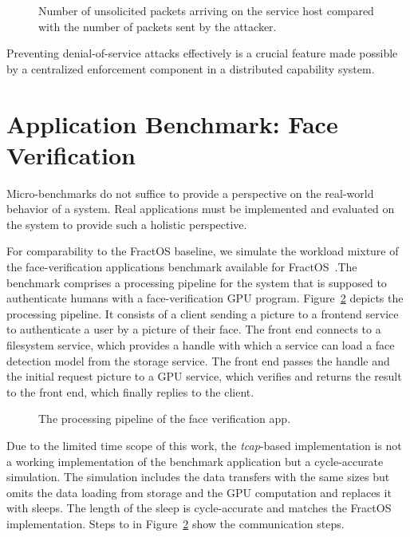 \begin{figure}[H]
  \centering
  
  \caption{\label{fig:dos-protection} Number of unsolicited packets arriving on the service host compared with the number of packets sent by the attacker.}
\end{figure}
Preventing denial-of-service attacks effectively is a crucial feature made possible by a centralized enforcement component in a distributed capability system.

\section{Application Benchmark: Face Verification}
Micro-benchmarks do not suffice to provide a perspective on the real-world behavior of a system. Real applications must be implemented and evaluated on the system to provide such a holistic perspective.

For comparability to the FractOS baseline, we simulate the workload mixture of the face-verification applications benchmark available for FractOS~\cite{vilanovaSlashingDisaggregationTax2022}.\@ The benchmark comprises a processing pipeline for the system that is supposed to authenticate humans with a face-verification \ac{GPU} program. Figure~\ref{fig:facever-overview} depicts the processing pipeline. It consists of a client sending a picture to a frontend service to authenticate a user by a picture of their face. The front end connects to a filesystem service, which provides a handle with which a service can load a face detection model from the storage service. The front end passes the handle and the initial request picture to a \ac{GPU} service, which verifies and returns the result to the front end, which finally replies to the client.

\begin{figure}[H]
  \centering
  
  \caption{\label{fig:facever-overview} The processing pipeline of the face verification app.}
\end{figure}
Due to the limited time scope of this work, the \emph{tcap}-based implementation is not a working implementation of the benchmark application but a cycle-accurate simulation. The simulation includes the data transfers with the same sizes but omits the data loading from storage and the \ac{GPU} computation and replaces it with sleeps. The length of the sleep is cycle-accurate and matches the FractOS implementation. Steps  to  in Figure~\ref{fig:facever-overview} show the communication steps.

